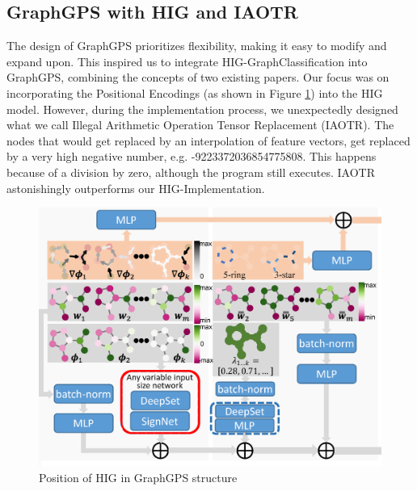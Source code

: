 \subsection{GraphGPS with HIG and IAOTR}
\label{sec:graphgps_hig}
The design of GraphGPS prioritizes flexibility, making it easy to modify and expand upon. This inspired us to integrate HIG-GraphClassification into GraphGPS, combining the concepts of two existing papers. Our focus was on incorporating the Positional Encodings (as shown in Figure \ref{fig:gps-hig-position}) into the HIG model. However, during the implementation process, we unexpectedly designed what we call Illegal Arithmetic Operation Tensor Replacement (IAOTR). The nodes that would get replaced by an interpolation of feature vectors, get replaced by a very high negative number, e.g. -9223372036854775808. This happens because of a division by zero, although the program still executes. IAOTR astonishingly outperforms our HIG-Implementation.

\begin{figure}[!ht]
    \centering
    \includegraphics[scale=0.2]{tex/res/gps_hig_position.png}
    \caption{Position of HIG in GraphGPS structure}
    \label{fig:gps-hig-position}
\end{figure}

